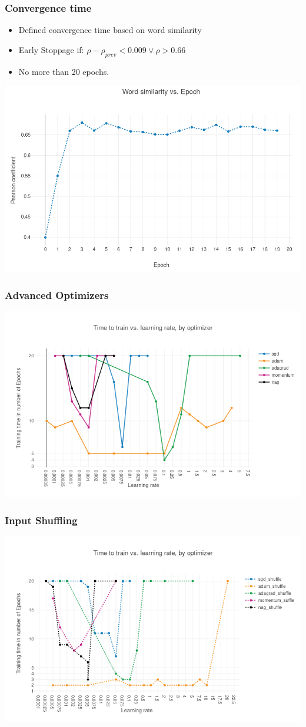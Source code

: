 \begin{frame}
\frametitle{Convergence time}
\begin{itemize}
\item Defined convergence time based on word similarity
\item Early Stoppage if: $ \rho -  \rho_{prev} < 0.009 \vee \rho > 0.66$ 
\item No more than 20 epochs. 
\end{itemize}
\includegraphics[scale=0.3]{images/wordsim_convergence}
\end{frame}
\begin{frame}
\frametitle{Advanced Optimizers}
\includegraphics[scale=0.4]{images/results_optim}
\end{frame}
\begin{frame}
\frametitle{Input Shuffling}
\includegraphics[scale=0.4]{images/results_shuffle}
\end{frame}